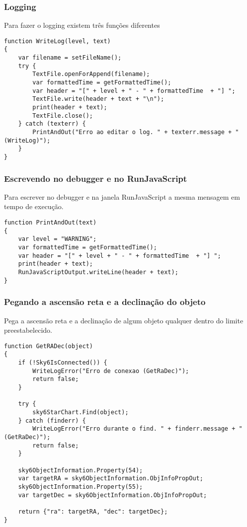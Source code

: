\documentclass{article}
\begin{document}
\subsubsection{Logging}

Para fazer o logging existem três funções diferentes

\begin{lstlisting}
function WriteLog(level, text)
{
    var filename = setFileName();
    try {
        TextFile.openForAppend(filename);
        var formattedTime = getFormattedTime();
        var header = "[" + level + " - " + formattedTime  + "] ";
        TextFile.write(header + text + "\n");
        print(header + text);
        TextFile.close();
    } catch (texterr) {
        PrintAndOut("Erro ao editar o log. " + texterr.message + " (WriteLog)");
    }
}
\end{lstlisting}

\subsubsection{Escrevendo no debugger e no RunJavaScript}

Para escrever no debugger e na janela RunJavaScript a mesma mensagem em tempo de execução.

\begin{lstlisting}
function PrintAndOut(text)
{
    var level = "WARNING";
    var formattedTime = getFormattedTime();
    var header = "[" + level + " - " + formattedTime  + "] ";
    print(header + text);
    RunJavaScriptOutput.writeLine(header + text);
}
\end{lstlisting}

\subsubsection{Pegando a ascensão reta e a declinação do objeto}

Pega a ascensão reta e a declinação de algum objeto qualquer dentro do limite preestabelecido.

\begin{lstlisting}
function GetRADec(object)
{
    if (!Sky6IsConnected()) {
        WriteLogError("Erro de conexao (GetRaDec)");
        return false;
    }

    try {
        sky6StarChart.Find(object);
    } catch (finderr) {
        WriteLogError("Erro durante o find. " + finderr.message + " (GetRaDec)");
        return false;
    }

    sky6ObjectInformation.Property(54);
    var targetRA = sky6ObjectInformation.ObjInfoPropOut;
    sky6ObjectInformation.Property(55);
    var targetDec = sky6ObjectInformation.ObjInfoPropOut;

    return {"ra": targetRA, "dec": targetDec};
}
\end{lstlisting}
\end{document}
